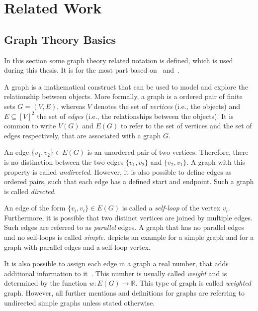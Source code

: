 \chapter{Related Work}
\label{cha:related-work}


\section{Graph Theory Basics}
\label{sec:graph-theory-basics}

In this section some graph theory related notation is defined, which is used during this thesis.
It is for the most part based on~\cite{Thulasiraman1992} and~\cite{Diestel2012}.

A graph is a mathematical construct that can be used to model and explore the relationship between objects.
More formally, a graph is a ordered pair of finite sets \( G = (V, E) \), whereas \( V \) denotes the set of \emph{vertices} (i.e., the objects) and \( E \subseteq [V]^{2} \) the set of \emph{edges} (i.e., the relationships between the objects).
It is common to write \( V(G) \) and \( E(G) \) to refer to the set of vertices and the set of edges respectively, that are associated with a graph \( G \).

An edge \( \{v_1, v_2\} \in E(G) \) is an unordered pair of two vertices.
Therefore, there is no distinction between the two edges \( \{v_1, v_2 \} \) and \( \{v_2, v_1\} \).
A graph with this property is called \emph{undirected}.
However, it is also possible to define edges as ordered pairs, such that each edge has a defined start and endpoint.
Such a graph is called \emph{directed}.

An edge of the form \( \{v_i, v_i\} \in E(G) \) is called a \emph{self-loop} of the vertex \( v_i \).
Furthermore, it is possible that two distinct vertices are joined by multiple edges.
Such edges are referred to as \emph{parallel} edges.
A graph that has no parallel edges and no self-loops is called \emph{simple}.
 depicts an example for a simple graph and for a graph with parallel edges and a self-loop vertex.

It is also possible to assign each edge in a graph a real number, that adds additional information to it~\cite{Cormen2009}.
This number is usually called \emph{weight} and is determined by the function \( w : E(G) \rightarrow \mathbb{R} \).
This type of graph is called \emph{weighted} graph.
However, all further mentions and definitions for graphs are referring to undirected simple graphs unless stated otherwise.

